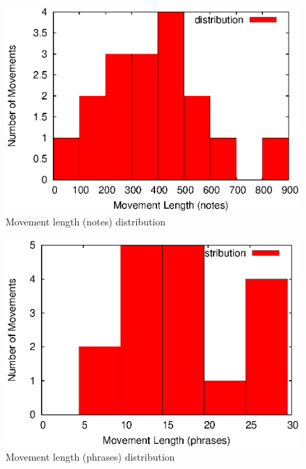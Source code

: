 \begin{figure}[tp]
   \begin{center}
      \includegraphics[width=\textwidth]{fig/notes}

   \end{center}
   \caption{Movement length (notes) distribution}
   \label{fig:notes}
\end{figure}

\begin{figure}[tp]
   \begin{center}
      \includegraphics[width=\textwidth]{fig/phrases}

   \end{center}
   \caption{Movement length (phrases) distribution}
   \label{fig:phrases}
\end{figure}

